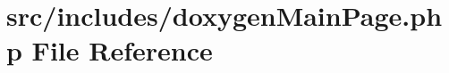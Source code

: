 \hypertarget{doxygenMainPage_8php}{\section{src/includes/doxygen\-Main\-Page.php \-File \-Reference}
\label{doxygenMainPage_8php}
}
